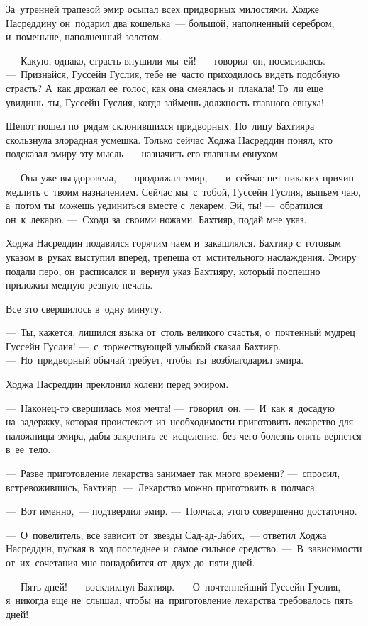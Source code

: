 \documentclass[12pt,a4paper]{book}
\begin{document}
За~утренней трапезой эмир осыпал всех придворных милостями. Ходже Насреддину он~подарил два кошелька~— большой, наполненный серебром, и~поменьше, наполненный золотом.

—~Какую, однако, страсть внушили мы~ей! —~говорил~он, посмеиваясь. —~Признайся, Гуссейн Гуслия, тебе не~часто приходилось видеть подобную страсть? А~как дрожал ее~голос, как она смеялась и~плакала! То~ли еще увидишь~ты, Гуссейн Гуслия, когда займешь должность главного евнуха!

Шепот пошел по~рядам склонившихся придворных. По~лицу Бахтияра скользнула злорадная усмешка. Только сейчас Ходжа Насреддин понял, кто подсказал эмиру эту мысль~— назначить его главным евнухом.

—~Она уже выздоровела,~— продолжал эмир,~— и~сейчас нет никаких причин медлить с~твоим назначением. Сейчас мы~с~тобой, Гуссейн Гуслия, выпьем чаю, а~потом ты~можешь уединиться вместе с~лекарем. Эй, ты! —~обратился он~к~лекарю. —~Сходи за~своими ножами. Бахтияр, подай мне указ.

Ходжа Насреддин подавился горячим чаем и~закашлялся. Бахтияр с~готовым указом в~руках выступил вперед, трепеща от~мстительного наслаждения. Эмиру подали перо, он~расписался и~вернул указ Бахтияру, который поспешно приложил медную резную печать.

Все это свершилось в~одну минуту.

—~Ты, кажется, лишился языка от~столь великого счастья, о~почтенный мудрец Гуссейн Гуслия! —~с~торжествующей улыбкой сказал Бахтияр. —~Но~придворный обычай требует, чтобы ты~возблагодарил эмира.

Ходжа Насреддин преклонил колени перед эмиром.

—~Наконец-то свершилась моя мечта! —~говорил~он. —~И~как я~досадую на~задержку, которая проистекает из~необходимости приготовить лекарство для наложницы эмира, дабы закрепить ее~исцеление, без чего болезнь опять вернется в~ее~тело.

—~Разве приготовление лекарства занимает так много времени? —~спросил, встревожившись, Бахтияр. —~Лекарство можно приготовить в~полчаса.

—~Вот именно,~— подтвердил эмир. —~Полчаса, этого совершенно достаточно.

—~О~повелитель, все зависит от~звезды Сад-ад-Забих,~— ответил Ходжа Насреддин, пуская в~ход последнее и~самое сильное средство. —~В~зависимости от~их~сочетания мне понадобится от~двух до~пяти дней.

—~Пять дней! —~воскликнул Бахтияр. —~О~почтеннейший Гуссейн Гуслия, я~никогда еще не~слышал, чтобы на~приготовление лекарства требовалось пять дней!
\end{document}
